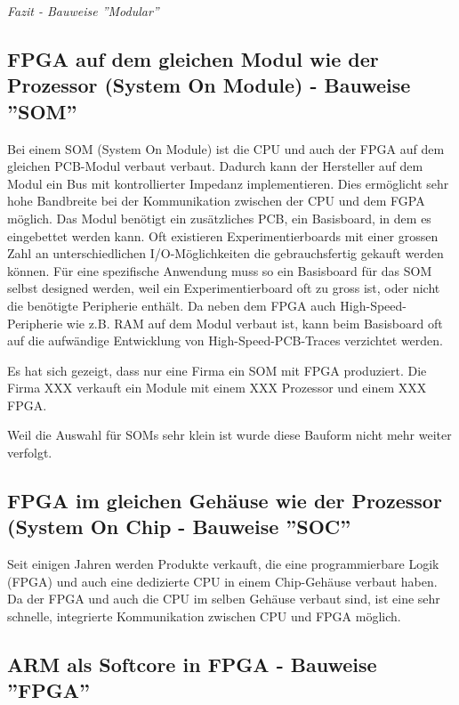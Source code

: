 \textit{Fazit - Bauweise ''Modular''}

\subsection{FPGA auf dem gleichen Modul wie der Prozessor (System On Module) - Bauweise ''SOM''}
Bei einem SOM (System On Module) ist die CPU und auch der FPGA auf dem gleichen PCB-Modul verbaut verbaut.
Dadurch kann der Hersteller auf dem Modul ein Bus mit kontrollierter Impedanz implementieren.
Dies ermöglicht sehr hohe Bandbreite bei der Kommunikation zwischen der CPU und dem FGPA möglich.
Das Modul benötigt ein zusätzliches PCB, ein Basisboard, in dem es eingebettet werden kann.
Oft existieren Experimentierboards mit einer grossen Zahl an unterschiedlichen I/O-Möglichkeiten die gebrauchsfertig gekauft werden können.
Für eine spezifische Anwendung muss so ein Basisboard für das SOM selbst designed werden, weil ein Experimentierboard oft zu gross ist, oder nicht die benötigte Peripherie enthält.
Da neben dem FPGA auch High-Speed-Peripherie wie z.B. RAM auf dem Modul verbaut ist, kann beim Basisboard oft auf die aufwändige Entwicklung von High-Speed-PCB-Traces verzichtet werden.

Es hat sich gezeigt, dass nur eine Firma ein SOM mit FPGA produziert.
Die Firma XXX verkauft ein Module mit einem XXX Prozessor und einem XXX FPGA.


Weil die Auswahl für SOMs sehr klein ist wurde diese Bauform nicht mehr weiter verfolgt.

 
\subsection{FPGA im gleichen Gehäuse wie der Prozessor (System On Chip - Bauweise ''SOC''}
Seit einigen Jahren werden Produkte verkauft, die eine programmierbare Logik (FPGA) und auch eine dedizierte CPU in einem Chip-Gehäuse verbaut haben.
Da der FPGA und auch die CPU im selben Gehäuse verbaut sind, ist eine sehr schnelle, integrierte Kommunikation zwischen CPU und FPGA möglich.


\subsection{ARM als Softcore in FPGA - Bauweise ''FPGA''}

